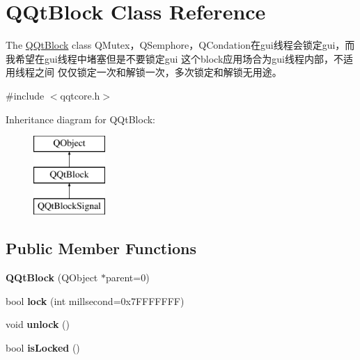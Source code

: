 \hypertarget{class_q_qt_block}{}\section{Q\+Qt\+Block Class Reference}
\label{class_q_qt_block}


The \mbox{\hyperlink{class_q_qt_block}{Q\+Qt\+Block}} class Q\+Mutex，\+Q\+Semphore，\+Q\+Condation在gui线程会锁定gui，而我希望在gui线程中堵塞但是不要锁定gui 这个block应用场合为gui线程内部，不适用线程之间 仅仅锁定一次和解锁一次，多次锁定和解锁无用途。  




{\ttfamily \#include $<$qqtcore.\+h$>$}

Inheritance diagram for Q\+Qt\+Block\+:\begin{figure}[H]
\begin{center}
\leavevmode
\includegraphics[height=3.000000cm]{class_q_qt_block}
\end{center}
\end{figure}
\subsection*{Public Member Functions}
\begin{DoxyCompactItemize}
\item 
\mbox{\label{class_q_qt_block_a3c6b5df6bb8c987532faa07b73f81d57}} 
{\bfseries Q\+Qt\+Block} (Q\+Object $\ast$parent=0)
\item 
\mbox{\label{class_q_qt_block_aa29223d76054f125fff4049fce746297}} 
bool {\bfseries lock} (int millsecond=0x7\+F\+F\+F\+F\+F\+F\+F)
\item 
\mbox{\label{class_q_qt_block_a6db74f9308dd5d6cb37b1cc534d6eb94}} 
void {\bfseries unlock} ()
\item 
\mbox{\label{class_q_qt_block_a5158ffc7c788f8a7ad030c38d33277f0}} 
bool {\bfseries is\+Locked} ()
\end{DoxyCompactItemize}


